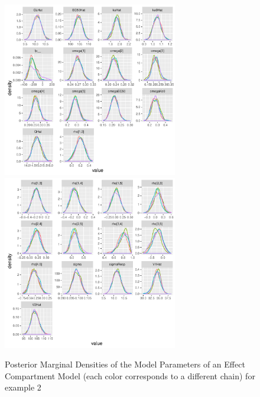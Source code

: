 \documentclass[11pt]{amsart}
\begin{document}
\begin{figure}[htbp]
\includegraphics[width=3.0in,trim=0in 0in 0 0in]{graphics/effCptModelTorsten/effCptModelTorstenPlots006.pdf}
\includegraphics[width=3.0in,trim=0in 0in 0 0in]{graphics/effCptModelTorsten/effCptModelTorstenPlots007.pdf}
\caption{{Posterior Marginal Densities of the Model Parameters of an Effect Compartment Model (each color corresponds to a different chain) for example 2}}
\label{effCptModelDens}
\end{figure}
\end{document}
